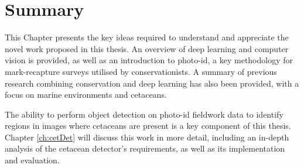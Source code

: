 \section{Summary}\label{ch:Background,sec:Summary}

This Chapter presents the key ideas required to understand and appreciate the novel work proposed in this thesis. An overview of deep learning and computer vision is provided, as well as an introduction to photo-id, a key methodology for mark-recapture surveys utilised by conservationists. A summary of previous research combining conservation and deep learning has also been provided, with a focus on marine environments and cetaceans. 

The ability to perform object detection on photo-id fieldwork data to identify regions in images where cetaceans are present is a key component of this thesis. Chapter \ref{ch:cetDet} will discuss this work in more detail, including an in-depth analysis of the cetacean detector's requirements, as well as its implementation and evaluation.

